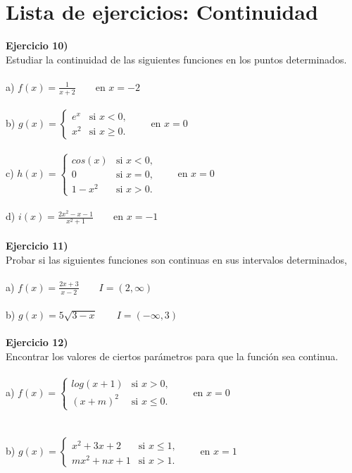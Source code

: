 \documentclass[11pt, a4paper]{article}
\begin{document}
{\section{Lista de ejercicios: Continuidad }
\textbf{Ejercicio 10)} \\
Estudiar la continuidad de las siguientes funciones en los puntos determinados.  \\ \\
a) $\displaystyle f(x) = \frac{1}{x+2} $ ~ ~ en $x = -2 $ \\ \\ 
b) $ g(x) = \begin{cases}
              e^x & \text{si } x < 0,\\
               x^2 & \text{si } x \geq 0.
          \end{cases} $ ~ ~ en $x=0$ \\ \\
c) $ h(x) = \begin{cases}
              cos(x) & \text{si } x < 0,\\
               0 & \text{si } x = 0,\\
               1-x^2 & \text{si } x > 0.
          \end{cases} $ ~ ~ en $x=0$ \\ \\
d) $ \displaystyle i(x) = \frac{2x^2 - x - 1}{x^2 + 1} $ ~ ~ en $x=-1$ \\ \\ 
\textbf{Ejercicio 11)} \\ 
Probar si las siguientes funciones son continuas en sus intervalos determinados, \\ \\ 
a) $ \displaystyle f(x) = \frac{2x + 3}{x-2} $ ~ ~ $I = ( 2, \infty )$ \\ \\
b) $ \displaystyle g(x) = 5\sqrt{3-x} $ ~ ~ $I=(-\infty,3)$ \\ \\
\textbf{Ejercicio 12) } \\ 
Encontrar los valores de ciertos par\'ametros para que la funci\'on sea continua. \\ \\
a) $ f(x) = \begin{cases}
              log(x+1) & \text{si } x > 0,\\
               (x+m)^2 & \text{si } x \leq 0.
          \end{cases} $ ~ ~ en $x=0$\\ \\ \\
b) $ g(x) = \begin{cases}
              x^2 + 3x + 2 & \text{si } x \leq 1,\\
               mx^2 + nx +1 & \text{si } x > 1.
          \end{cases} $ ~ ~ en $x=1$  

}
\end{document}
